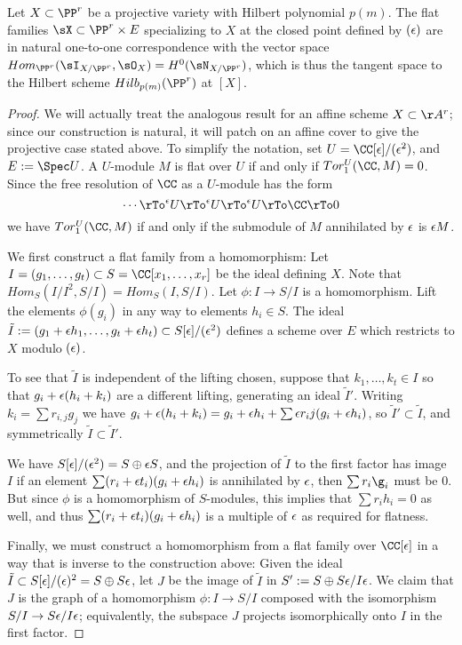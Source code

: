 \begin{theorem}
Let $X\subset \PP^r$ be a projective variety with Hilbert polynomial $p(m)$. The flat families 
$\sX \subset \PP^r\times E$ specializing to $X$ at the closed point defined by $(\eps)$
are in natural one-to-one correspondence with the vector space $Hom_{\PP^r}(\sI_{X/\PP^r}, \sO_X) = H^0(\sN_{X/\PP^r})$, which is thus the tangent space to the Hilbert scheme $Hilb_{p(m)}(\PP^r)$ at $[X]$.
\end{theorem}

\begin{proof}
We will actually treat the analogous result for an affine scheme $X \subset \AA^r$; since our construction is natural, it will patch on an affine cover to give the projective case stated above. To simplify the notation, set $U = \CC[\eps]/(\eps^2)$,
and $E:= \Spec U$.
A $U$-module $M$ is flat  over $U$ if and only if $Tor_1^U(\CC,M) = 0$. 
Since the free resolution of $\CC$ as a $U$-module has the form
$$
\cdots \rTo^\eps U \rTo^\eps U \rTo^\eps U \rTo \CC \rTo 0
$$
we have $Tor_1^U(\CC,M)$ if and only if the submodule of $M$ annihilated by $\eps$ is $\eps M$.

We first construct a flat family from a homomorphism: Let $I = (g_1,\dots, g_t)\subset S = \CC[x_1,\dots, x_r]$ be the ideal defining $X$. 
Note that $Hom_S(I/I^2, S/I) = Hom_S(I,S/I)$. Let $\phi: I\to S/I$ is a homomorphism. Lift the elements $\phi(g_i)$ in any way to elements
$h_i \in S.$ The ideal
$\tilde I := (g_1+\eps h_1,\dots, g_t+\eps h_t)\subset S[\eps]/(\eps^2)$
defines a scheme over $E$ which restricts to $X$ modulo $(\eps)$. 

To see that $\tilde I$ is 
independent of the lifting chosen, suppose that $k_1,\dots,k_t\in I$ so that $g_i+\eps(h_i+k_i)$ are a different lifting,
generating an ideal $\tilde I'$.
Writing $k_i = \sum r_{i,j}g_j$ we have $g_i+\eps(h_i+k_i) = g_i+\eps h_i+ \sum \eps r_ij(g_i+\eps h_i)$, so 
$\tilde I' \subset \tilde I$, and symmetrically $\tilde I \subset \tilde I'$.

We have $S[\eps]/(\eps^2) = S \oplus \eps S$, and the projection of $\tilde I$ to the first factor has image $I$
if an element $\sum (r_i+\eps t_i)(g_i+\eps h_i)$ is annihilated by $\eps$, then $\sum r_i\g_i$ must be 0. But
since $\phi$ is a homomorphism of $S$-modules, this implies that $\sum r_i h_i = 0$ as well, and thus
$\sum (r_i+\eps t_i)(g_i+\eps h_i)$ is a multiple of $\eps$ as required for flatness.

Finally, we must construct a homomorphism from a flat family over $\CC[\eps]$ in a way that is inverse to the construction above: Given the ideal $\tilde I \subset S[\eps]/(\eps)^2 = S\oplus S\eps$,
let $J$ be the image of $\tilde I$ in $S':= S\oplus S\eps/I\eps$. We claim that $J$ is the graph of a homomorphism $\phi: I \to  S/I$
composed with the isomorphism $S/I \to S\eps/I\eps$; equivalently, the subspace $J$ projects isomorphically onto $I$ in the first factor. 


\end{proof}
